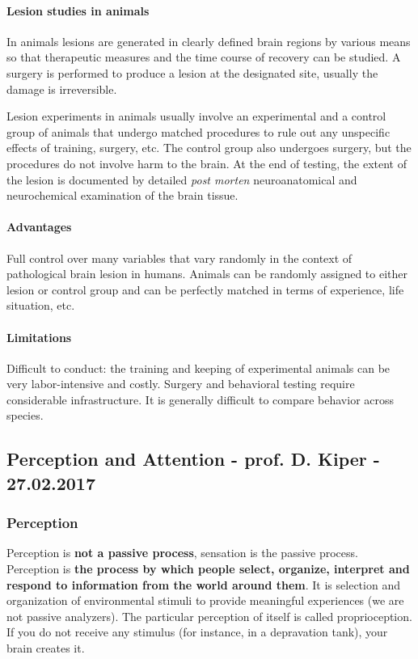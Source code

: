 \documentclass[12pt,article,oneside,a4paper]{memoir}
\begin{document}
\paragraph{Lesion studies in animals}
In animals lesions are generated in clearly defined brain regions by various
means so that therapeutic measures and the time course of recovery can be
studied. A surgery is performed to produce a lesion at the designated site,
usually the damage is irreversible.

Lesion experiments in animals usually involve an experimental and a control
group of animals that undergo matched procedures to rule out any unspecific
effects of training, surgery, etc. The control group also undergoes surgery,
but the procedures do not involve harm to the brain. At the end of testing,
the extent of the lesion is documented by detailed \textit{post morten}
neuroanatomical and neurochemical examination of the brain tissue.

\paragraph{Advantages}
Full control over many variables that vary randomly in the context of
pathological brain lesion in humans. Animals can be randomly assigned to either
lesion or control group and can be perfectly matched in terms of experience,
life situation, etc.

\paragraph{Limitations}
Difficult to conduct: the training and keeping of experimental animals can be
very labor-intensive and costly. Surgery and behavioral testing require
considerable infrastructure. It is generally difficult to compare behavior
across species.

\newpage
\subsection{Perception and Attention - prof. D. Kiper - 27.02.2017}

\subsubsection{Perception}
Perception is \textbf{not a passive process}, sensation is the passive process.
Perception is \textbf{the process by which people select, organize, interpret
and respond to information from the world around them}. It is selection and
organization of environmental stimuli to provide meaningful experiences (we are
not passive analyzers). The particular perception of itself is called
proprioception. If you do not receive any stimulus (for instance, in a
depravation tank), your brain creates it.
\end{document}
